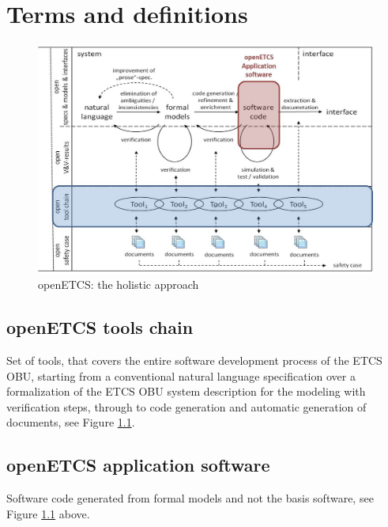 \documentclass{template/openetcs_report}
\begin{document}
\mainmatter


\chapter{Terms and definitions}
\label{common-terms}

\begin{figure}[h]
  \centering
  \includegraphics[width=16cm]{openETCS1}
  \caption{openETCS: the holistic approach}
  \label{fig:openETCS1}
\end{figure}

\section{openETCS tools chain}
Set of tools, that covers the entire software development process of the ETCS OBU,
starting from a conventional natural language specification over a formalization of the ETCS OBU system
description for the modeling with verification steps, through to code generation
and automatic generation of documents, see Figure \ref{fig:openETCS1}.\\

\section{openETCS application software}
Software code generated from formal models and not the basis software, see Figure \ref{fig:openETCS1} above.\\
\end{document}
